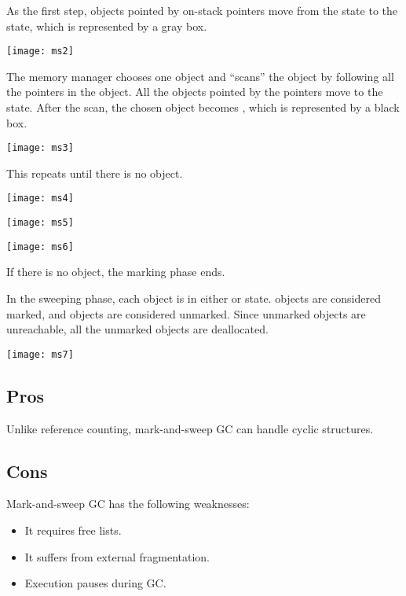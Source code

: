 As the first step, objects pointed by on-stack pointers move from the \urch
state to the \uscn state, which is represented by a gray box.

\begin{center}
\texttt{[image: ms2]}
\end{center}

The memory manager chooses one \uscn object and ``scans'' the object by
following all the pointers in the object.  All the \urch objects pointed by the
pointers move to the \uscn state. After the scan, the chosen object becomes
\scn, which is represented by a black box.

\begin{center}
\texttt{[image: ms3]}
\end{center}

This repeats until there is no \uscn object.

\begin{center}
\texttt{[image: ms4]}

\texttt{[image: ms5]}

\texttt{[image: ms6]}
\end{center}

If there is no \uscn object, the marking phase ends.

In the sweeping phase, each object is in either \urch or \scn state.  \scn
objects
are considered marked, and \urch objects are considered unmarked.  Since unmarked
objects are unreachable, all the unmarked objects are deallocated.

\begin{center}
\texttt{[image: ms7]}
\end{center}

\subsection{Pros}

Unlike reference counting, mark-and-sweep GC can handle cyclic structures.

\subsection{Cons}

Mark-and-sweep GC has the following weaknesses:

\begin{itemize}
  \item It requires free lists.
  \item It suffers from external fragmentation.
  \item Execution pauses during GC.
\end{itemize}

